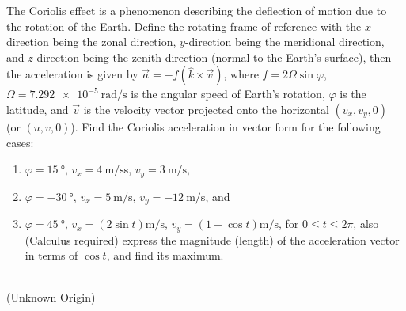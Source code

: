 \begin{Exercise}
The Coriolis effect is a phenomenon describing the deflection of motion due to the rotation of the Earth. Define the rotating frame of reference with the $x$-direction being the zonal direction, $y$-direction being the meridional direction, and $z$-direction being the zenith direction (normal to the Earth's surface), then the acceleration is given by $\vec{a} = -f (\hat{k} \times \vec{v})$, where $f = 2\Omega\sin{\varphi}$, $\Omega = \SI{7.292e-5}{\radian \per \s}$ is the angular speed of Earth's rotation, $\varphi$ is the latitude, and $\vec{v}$ is the velocity vector projected onto the horizontal $(v_x, v_y, 0)$ (or $(u, v, 0)$). Find the Coriolis acceleration in vector form for the following cases:
\begin{enumerate}[label=(\alph*)]
\item $\varphi = \SI{15}{\degree}$, $v_x = \SI{4}{\m \per \s}$s, $v_y = \SI{3}{\m \per \s}$,
\item $\varphi = -\SI{30}{\degree}$, $v_x = \SI{5}{\m \per \s}$, $v_y = -\SI{12}{\m \per \s}$, and
\item $\varphi = \SI{45}{\degree}$, $v_x = (2\sin{t})\si{\m \per \s}$, $v_y = (1 + \cos{t}) \si{\m \per \s}$, for $0 \leq t \leq 2\pi$, also (Calculus required) express the magnitude (length) of the acceleration vector in terms of $\cos t$, and find its maximum.
\end{enumerate}
\begin{center}
 \\
(Unknown Origin)
\end{center}
\end{Exercise}